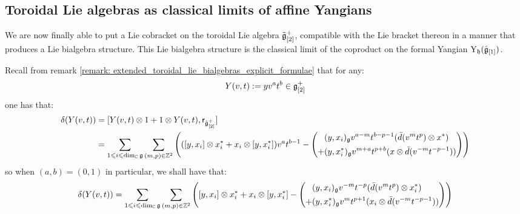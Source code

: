         \subsection{Toroidal Lie algebras as classical limits of affine Yangians}
            We are now finally able to put a Lie cobracket on the toroidal Lie algebra $\tilde{\mathfrak{g}}_{[2]}^+$, compatible with the Lie bracket thereon in a manner that produces a Lie bialgebra structure. This Lie bialgebra structure is the classical limit of the coproduct on the formal Yangian $\mathrm{Y}_{\mathfrak{h}}(\hat{\mathfrak{g}}_{[1]})$. 
            \begin{remark}
                Recall from remark \ref{remark: extended_toroidal_lie_bialgebras_explicit_formulae} that for any:
                    $$Y(v, t) := y v^a t^b \in \mathfrak{g}_{[2]}^+$$
                one has that:
                    $$
                        \begin{aligned}
                            \delta(Y(v, t)) & = [Y(v, t) \tensor 1 + 1 \tensor Y(v, t), \sfr_{ \hat{\g}_{[2]}^+ }]
                            \\
                            & = \sum_{1 \leq i \leq \dim_{\bbC} \g} \sum_{(m, p) \in \Z^2} \left( ( [y, x_i] \tensor x_i^* + x_i \tensor [y, x_i^*] ) v^a t^{b - 1} - \left(
                            \begin{aligned}
                                & (y, x_i)_{\g} v^{a - m} t^{b - p - 1} ( \bar{d}(v^m t^p) \tensor x^* )
                                \\
                                + & (y, x_i^*)_{\g} v^{m + a} t^{p + b} ( x \tensor \bar{d}(v^{-m} t^{-p - 1}) )
                            \end{aligned}
                            \right) \right)
                        \end{aligned}
                    $$
                so when $(a, b) = (0, 1)$ in particular, we shall have that:
                    $$\delta(Y(v, t)) = \sum_{1 \leq i \leq \dim_{\bbC} \g} \sum_{(m, p) \in \Z^2} \left(
                        [y, x_i] \tensor x_i^* + x_i \tensor [y, x_i^*] -
                        \left(
                            \begin{aligned}
                                & (y, x_i)_{\g} v^{-m} t^{-p} ( \bar{d}(v^m t^p) \tensor x_i^* )
                                \\
                                + & (y, x_i^*)_{\g} v^m t^{p + 1} ( x_i \tensor \bar{d}(v^{-m} t^{-p - 1}) )
                            \end{aligned}
                        \right)
                    \right)$$
            \end{remark}
